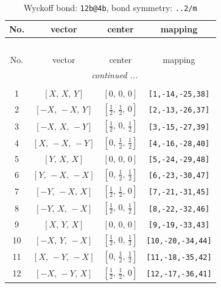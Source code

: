 \documentclass[fleqn,8pt]{jsarticle}
\begin{document}
\begin{longtable}{cccc}
\caption{Wyckoff bond: {\tt 12b@4b}, bond symmetry: {\tt ..2/m}}
 \\
 \hline \hline
No. & vector & center & mapping \\ \hline \endfirsthead

\multicolumn{3}{l}{\tablename\ \thetable{}} \\
 \hline \hline
No. & vector & center & mapping \\ \hline \endhead

 \hline \hline
\multicolumn{3}{r}{\footnotesize\it continued ...} \\ \endfoot

 \hline \hline
\multicolumn{3}{r}{} \\ \endlastfoot

1 & $\left[ X,\, X,\, Y \right]$ & $\left[ 0,\, 0,\, 0 \right]$ & {\tt [1,-14,-25,38]} \\ \hline
2 & $\left[ - X,\, - X,\, Y \right]$ & $\left[ \frac{1}{2},\, \frac{1}{2},\, 0 \right]$ & {\tt [2,-13,-26,37]} \\ \hline
3 & $\left[ - X,\, X,\, - Y \right]$ & $\left[ \frac{1}{2},\, 0,\, \frac{1}{2} \right]$ & {\tt [3,-15,-27,39]} \\ \hline
4 & $\left[ X,\, - X,\, - Y \right]$ & $\left[ 0,\, \frac{1}{2},\, \frac{1}{2} \right]$ & {\tt [4,-16,-28,40]} \\ \hline
5 & $\left[ Y,\, X,\, X \right]$ & $\left[ 0,\, 0,\, 0 \right]$ & {\tt [5,-24,-29,48]} \\ \hline
6 & $\left[ Y,\, - X,\, - X \right]$ & $\left[ 0,\, \frac{1}{2},\, \frac{1}{2} \right]$ & {\tt [6,-23,-30,47]} \\ \hline
7 & $\left[ - Y,\, - X,\, X \right]$ & $\left[ \frac{1}{2},\, \frac{1}{2},\, 0 \right]$ & {\tt [7,-21,-31,45]} \\ \hline
8 & $\left[ - Y,\, X,\, - X \right]$ & $\left[ \frac{1}{2},\, 0,\, \frac{1}{2} \right]$ & {\tt [8,-22,-32,46]} \\ \hline
9 & $\left[ X,\, Y,\, X \right]$ & $\left[ 0,\, 0,\, 0 \right]$ & {\tt [9,-19,-33,43]} \\ \hline
10 & $\left[ - X,\, Y,\, - X \right]$ & $\left[ \frac{1}{2},\, 0,\, \frac{1}{2} \right]$ & {\tt [10,-20,-34,44]} \\ \hline
11 & $\left[ X,\, - Y,\, - X \right]$ & $\left[ 0,\, \frac{1}{2},\, \frac{1}{2} \right]$ & {\tt [11,-18,-35,42]} \\ \hline
12 & $\left[ - X,\, - Y,\, X \right]$ & $\left[ \frac{1}{2},\, \frac{1}{2},\, 0 \right]$ & {\tt [12,-17,-36,41]} \\
\end{longtable}
\end{document}
